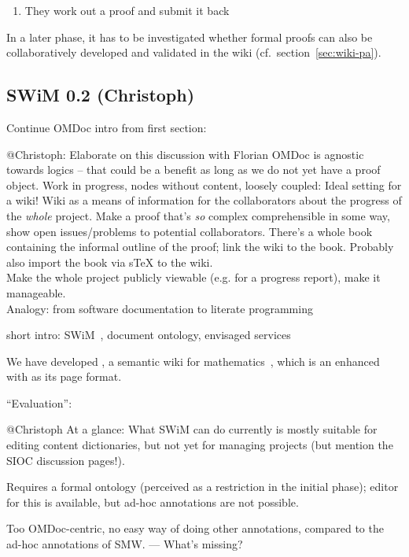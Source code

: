 \documentclass{llncs}
\begin{document}
\begin{enumerate}
\item They work out a proof and submit it back
\end{enumerate}

In a later phase, it has to be investigated whether formal proofs can also be
collaboratively developed and validated in the wiki (cf.\ section~\ref{sec:wiki-pa}).

\subsection{SWiM 0.2 (Christoph)}
\label{sec:swim}

Continue OMDoc intro from first section:
\begin{todo}{@Christoph: Elaborate on this discussion with Florian}
  OMDoc is agnostic towards logics -- that could be a benefit as long as we do not yet
  have a proof object. Work in progress, nodes without content, loosely coupled: Ideal
  setting for a wiki!  Wiki as a means of information for the collaborators about the
  progress of the \emph{whole} project.  Make a proof that's \emph{so} complex
  comprehensible in some way, show open issues/problems to potential collaborators.
  There's a whole book containing the informal outline of the proof; link the wiki to the
  book.  Probably also import the book via sTeX to the wiki.\\
  Make the whole project publicly viewable (e.g. for a progress report), make it
  manageable.\\
  Analogy: from software documentation to literate programming
\end{todo}

short intro: SWiM~\cite{Lange:swmkm-tr07}, document ontology, envisaged services 


We have developed {\swim}, a semantic wiki for mathematics~\cite{Lange:swmkm-tr07}, which
is an enhanced ~\cite{KrSchVr:semwiki-reasoning07} with {\omdoc} as its
page format.

``Evaluation'':
\begin{todo}{@Christoph}
At a glance: What SWiM can do currently is mostly suitable for editing content
dictionaries, but not yet for managing projects (but mention the SIOC discussion pages!).

Requires a formal ontology (perceived as a restriction in the initial phase); editor for
this is available, but ad-hoc annotations are not possible.

Too OMDoc-centric, no easy way of doing other annotations, compared to the ad-hoc
annotations of SMW. --- What's missing?
\end{todo}
\end{document}
